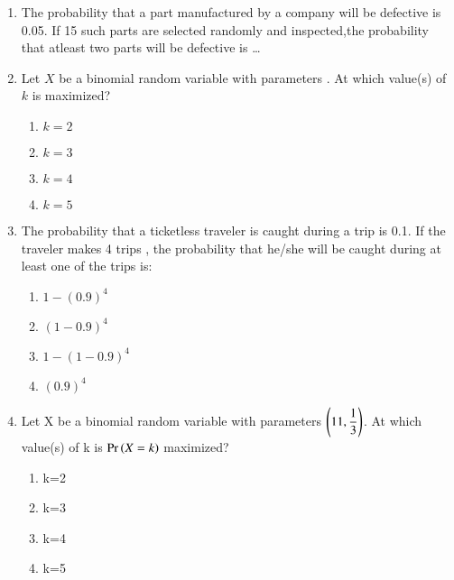 \renewcommand{\theequation}{\theenumi}
\renewcommand{\thefigure}{\theenumi}
\renewcommand{\thetable}{\theenumi}
\begin{enumerate}[label=\thesection.\arabic*.,ref=\thesection.\theenumi]

\item The probability that a part manufactured by a company will be defective is 0.05. If 15 such parts are selected randomly and inspected,the probability that atleast two parts will be defective is \dots
%
\\
\solution
%

%
\item Let $X$ be a binomial random variable with parameters . At which value(s) of $k$ is  maximized?\\
\begin{enumerate}
\item $k=2$ 
\item $k=3$ 
\item $k=4$ 
\item $k=5$
\end{enumerate}
%
\solution
%

%
\item The probability that a ticketless traveler is caught during a trip is 0.1. If the traveler makes 4 trips , the probability that he/she will be caught during at least one of the trips is:\\
\begin{enumerate}
    \item $1-(0.9)^4$
    \item $(1-0.9)^4$
    \item $1-(1-0.9)^4$
    \item $(0.9)^4$
\end{enumerate}
\solution

%
\item Let X be a binomial random variable with parameters  $\left(11,\displaystyle{\frac{1}{3}}\right)$. At which value(s) of k is $\Pr\left(X = k\right)$ maximized?\\
\begin{enumerate}
\item k=2
\item k=3
\item k=4
\item k=5
\end{enumerate}
%
\solution



\end{enumerate}